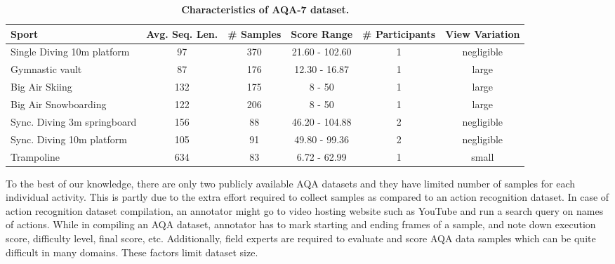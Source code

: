 \documentclass[10pt,twocolumn,letterpaper]{article}
\begin{document}
\begin{table*}[t]
\renewcommand*{\arraystretch}{1.1}
\small
\centering
\begin{tabular}{l|c c c c c}
\toprule

\textbf{Sport}                       & \textbf{Avg. Seq. Len.} & \textbf{\# Samples} & \textbf{Score Range} & \multicolumn{1}{l}{\textbf{\# Participants}} & \multicolumn{1}{l}{\textbf{View Variation}} \\ \midrule
Single Diving 10m platform  & 97                     & 370                     & 21.60 - 102.60       & 1                                           & negligible                                   \\ 
Gymnastic vault             & 87                     & 176                     & 12.30 - 16.87        & 1                                           & large                                        \\ 
Big Air Skiing              & 132                    & 175                     & 8 - 50               & 1                                           & large                                        \\  
Big Air Snowboarding        & 122                    & 206                     & 8 - 50               & 1                                           & large                                        \\ 
Sync. Diving 3m springboard & 156                    & 88                      & 46.20 - 104.88       & 2                                           & negligible                                   \\  
Sync. Diving 10m platform   & 105                    & 91                      & 49.80 - 99.36        & 2                                           & negligible                                   \\
Trampoline                  & 634                    & 83                      & 6.72 - 62.99         & 1                                           & small                                        \\ \toprule
\end{tabular}
\caption{\textbf{Characteristics of \textsc{AQA-7} dataset.}}
\label{table:1}
\end{table*} To the best of our knowledge, there are only two publicly available AQA datasets \cite{pirsia, parmar} and they have limited number of samples for each individual activity. This is partly due to the extra effort required to collect samples as compared to an action recognition dataset. In case of action recognition dataset compilation, an annotator might go to video hosting website such as YouTube and run a search query on names of actions. While in compiling an AQA dataset, annotator has to mark starting and ending frames of a sample, and note down execution score, difficulty level, final score, etc. Additionally, field experts are required to evaluate and score AQA data samples which can be quite difficult in many domains. These factors limit dataset size. 
\end{document}
